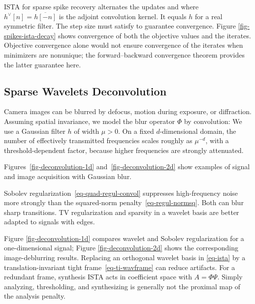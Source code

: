 ISTA for sparse spike recovery alternates the updates
and
where $h^\vee[n]=\overline{h[-n]}$ is the adjoint convolution kernel. It equals $h$ for a real symmetric filter. The step size must satisfy
to guarantee convergence. Figure \ref{fig-spikes-ista-decay} shows convergence of both the objective values and the iterates. Objective convergence alone would not ensure convergence of the iterates when minimizers are nonunique; the forward--backward convergence theorem provides the latter guarantee here.




                                                                
\subsection{Sparse Wavelets Deconvolution}


Camera images can be blurred by defocus, motion during exposure, or diffraction. Assuming spatial invariance, we model the blur operator $\Phi$ by convolution:
We use a Gaussian filter $h$ of width $\mu > 0$. On a fixed $d$-dimensional domain, the number of effectively transmitted frequencies scales roughly as $\mu^{-d}$, with a threshold-dependent factor, because higher frequencies are strongly attenuated.

Figures~\ref{fig-deconvolution-1d} and~\ref{fig-deconvolution-2d} show examples of signal and image acquisition with Gaussian blur.

Sobolev regularization~\eqref{eq-quad-regul-convol} suppresses high-frequency noise more strongly than the squared-norm penalty~\eqref{eq-regul-normsq}. Both can blur sharp transitions. TV regularization and sparsity in a wavelet basis are better adapted to signals with edges.

Figure \ref{fig-deconvolution-1d} compares wavelet and Sobolev regularization for a one-dimensional signal; Figure \ref{fig-deconvolution-2d} shows the corresponding image-deblurring results. Replacing an orthogonal wavelet basis in \eqref{eq-ista} by a translation-invariant tight frame~\eqref{eq-ti-wavframe} can reduce artifacts. For a redundant frame, synthesis ISTA acts in coefficient space with $A=\Phi\Psi$. Simply analyzing, thresholding, and synthesizing is generally not the proximal map of the analysis penalty.

